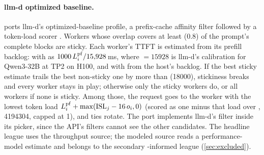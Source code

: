 \paragraph{llm-d optimized baseline.}
 ports llm-d's optimized-baseline profile, a prefix-cache affinity
filter followed by a token-load scorer \citep{llmdsticky}. Workers whose overlap covers at least
 (0.8) of the prompt's complete blocks are sticky. Each worker's TTFT is
estimated from its prefill backlog: with  as
$1000\,L^{\mathrm{pf}}_i/\num{15928}$\,ms, where ${}=\num{15928}$ is
llm-d's calibration for Qwen3-32B at TP2 on H100, and with  from the
host's  backlog. If the best sticky estimate trails the best non-sticky one by
more than  (\num{18000}), stickiness breaks and every worker stays in
play; otherwise only the sticky workers do, or all workers if none is sticky. Among those, the
request goes to the worker with the lowest token load $L^{\mathrm{pf}}_i + \max(\mathrm{ISL}_j - 16\,o_i, 0)$ (scored
as one minus that load over , \num{4194304}, capped at 1), and ties
rotate. The port implements llm-d's filter inside its picker, since the API's filters cannot see
the other candidates. The headline league uses the throughput source; the modeled source reads a
performance-model estimate and belongs to the secondary \ais{}-informed league (\cref{sec:excluded}).

